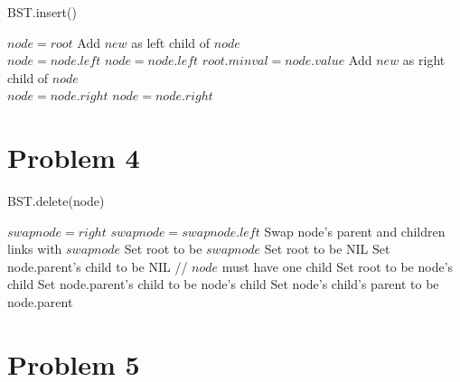 \documentclass[12pt, letterpaper]{article}
\begin{document}
\begin{algorithm}
    \caption{BST.insert()}
    \begin{minipage}{\textwidth}
        \begin{algorithmic}[1]
            \STATE $node = root$
                        \STATE Add $new$ as left child of $node$ \\
                        \STATE $node = node.left$
                    \ELSE
                        \STATE $node = node.left$
                    \ENDIF
                        \STATE $root.minval = node.value$
                    \ENDIF
                \ELSE
                        \STATE Add $new$ as right child of $node$ \\
                        $node = node.right$
                    \ELSE
                        \STATE $node = node.right$
                    \ENDIF
                \ENDIF
            \ENDWHILE
        \end{algorithmic}
    \end{minipage}
\end{algorithm}

\break
\section*{Problem 4}

\begin{algorithm}
    \caption{BST.delete(node)}
    \begin{minipage}{\textwidth}
        \begin{algorithmic}[1]
                \STATE $swapnode = right$
                    \STATE $swapnode = swapnode.left$
                \ENDWHILE
                \STATE Swap node's parent and children links with $swapnode$
                    \STATE Set root to be $swapnode$
                \ENDIF
            \ENDIF
                    \STATE Set root to be NIL
                \ELSE
                    \STATE Set node.parent's child to be NIL
                \ENDIF
            \ELSE
                \STATE // $node$ must have one child
                    \STATE Set root to be node's child
                \ELSE
                    \STATE Set node.parent's child to be node's child
                \ENDIF
                \STATE Set node's child's parent to be node.parent
            \ENDIF
        \end{algorithmic}
    \end{minipage}
\end{algorithm}

\break
\section*{Problem 5}

\blindtext
\end{document}
